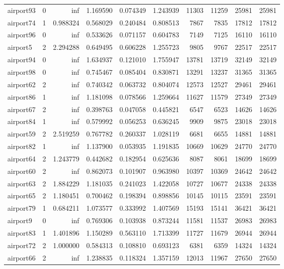 \begin{longtable}{|l|r|r|r|r|r|r|r|r|r|}
airport93 & 0 & inf & 1.169590 & 0.074349 & 1.243939 & 11303 & 11259 & 25981 & 25981 \\
airport74 & 1 & 0.988324 & 0.568029 & 0.240484 & 0.808513 & 7867 & 7835 & 17812 & 17812 \\
airport96 & 0 & inf & 0.533626 & 0.071157 & 0.604783 & 7149 & 7125 & 16110 & 16110 \\
airport5 & 2 & 2.294288 & 0.649495 & 0.606228 & 1.255723 & 9805 & 9767 & 22517 & 22517 \\
airport94 & 0 & inf & 1.634937 & 0.121010 & 1.755947 & 13781 & 13719 & 32149 & 32149 \\
airport98 & 0 & inf & 0.745467 & 0.085404 & 0.830871 & 13291 & 13237 & 31365 & 31365 \\
airport62 & 2 & inf & 0.740342 & 0.063732 & 0.804074 & 12573 & 12527 & 29461 & 29461 \\
airport86 & 1 & inf & 1.181098 & 0.078566 & 1.259664 & 11627 & 11579 & 27349 & 27349 \\
airport67 & 2 & inf & 0.398763 & 0.047058 & 0.445821 & 6547 & 6523 & 14626 & 14626 \\
airport84 & 1 & inf & 0.579992 & 0.056253 & 0.636245 & 9909 & 9875 & 23018 & 23018 \\
airport59 & 2 & 2.519259 & 0.767782 & 0.260337 & 1.028119 & 6681 & 6655 & 14881 & 14881 \\
airport82 & 1 & inf & 1.137900 & 0.053935 & 1.191835 & 10669 & 10629 & 24770 & 24770 \\
airport64 & 2 & 1.243779 & 0.442682 & 0.182954 & 0.625636 & 8087 & 8061 & 18699 & 18699 \\
airport60 & 2 & inf & 0.862073 & 0.101907 & 0.963980 & 10397 & 10369 & 24642 & 24642 \\
airport63 & 2 & 1.884229 & 1.181035 & 0.241023 & 1.422058 & 10727 & 10677 & 24338 & 24338 \\
airport65 & 2 & 1.180451 & 0.700462 & 0.198394 & 0.898856 & 10145 & 10115 & 23591 & 23591 \\
airport79 & 1 & 0.684211 & 1.073577 & 0.333992 & 1.407569 & 15193 & 15141 & 36421 & 36421 \\
airport9 & 0 & inf & 0.769306 & 0.103938 & 0.873244 & 11581 & 11537 & 26983 & 26983 \\
airport83 & 1 & 1.401896 & 1.150289 & 0.563110 & 1.713399 & 11727 & 11679 & 26944 & 26944 \\
airport72 & 2 & 1.000000 & 0.584313 & 0.108810 & 0.693123 & 6381 & 6359 & 14324 & 14324 \\
airport66 & 2 & inf & 1.238835 & 0.118324 & 1.357159 & 12013 & 11967 & 27650 & 27650 \\

\end{longtable}
